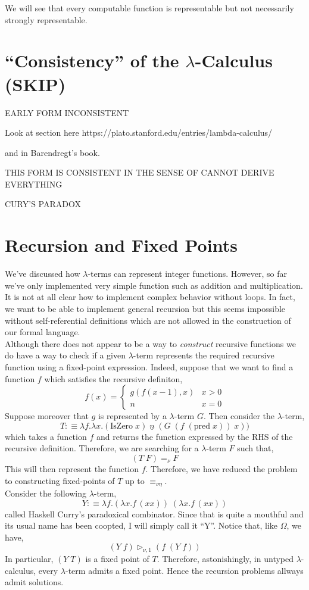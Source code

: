 \documentclass[12pt]{article}
\newcommand{\red}{\triangleright}
\newcommand{\bredo}{\red_{\nu,1}}
\begin{document}
\begin{rmk}
We will see that every computable function is representable but not necessarily strongly representable. 
\end{rmk}

\section{``Consistency'' of the $\lambda$-Calculus (SKIP)}

EARLY FORM INCONSISTENT

Look at section here https://plato.stanford.edu/entries/lambda-calculus/

and in Barendregt's book. 

THIS FORM IS CONSISTENT IN THE SENSE OF CANNOT DERIVE EVERYTHING

CURY'S PARADOX

\section{Recursion and Fixed Points}

We've discussed how $\lambda$-terms can represent integer functions. However, so far we've only implemented very simple function such as addition and multiplication. It is not at all clear how to implement complex behavior without loops. In fact, we want to be able to implement general recursion but this seems impossible without self-referential definitions which are not allowed in the construction of our formal language. 
\bigskip\\
Although there does not appear to be a way to \textit{construct} recursive functions we do have a way to check if a given $\lambda$-term represents the required recursive function using a fixed-point expression. Indeed, suppose that we want to find a function $f$ which satisfies the recursive definiton,
\[ f(x) = 
\begin{cases}
g(f(x-1), x) & x > 0
\\
n & x = 0
\end{cases}\]
Suppose moreover that $g$ is represented by a $\lambda$-term $G$. Then consider the $\lambda$-term,
\[ T :\equiv \lambda f . \lambda x . (\text{IsZero} \; x) \; \underline{n} \; (G \; (f \; (\text{pred} \; x)) \; x)) \]
which takes a function $f$ and returns the function expressed by the RHS of the recursive definition. Therefore, we are searching for a $\lambda$-term $F$ such that,
\[ (T \; F) =_\nu F \]
This will then represent the function $f$. Therefore, we have reduced the problem to constructing fixed-points of $T$ up to $\equiv_{\nu\eta}$.  
\bigskip\\
Consider the following $\lambda$-term,
\[ Y :\equiv \lambda f. (\lambda x. f \, (x x)) \; (\lambda x. f \, (x x)) \]
called Haskell Curry's paradoxical combinator. Since that is quite a mouthful and its usual name has been coopted, I will simply call it ``Y''. 
Notice that, like $\Omega$, we have,
\[ (Y \; f) \bredo (f \; (Y \; f)) \]
In particular, $(Y \; T)$ is a fixed point of $T$. Therefore, astonishingly, in untyped $\lambda$-calculus, every $\lambda$-term admits a fixed point. Hence the recursion problems allways admit solutions. 
\end{document}
